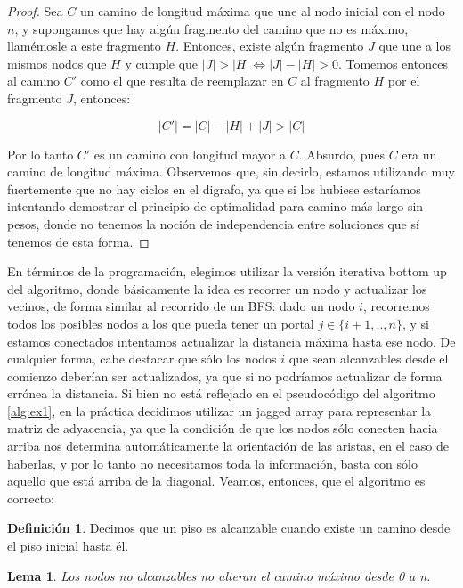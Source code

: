 \documentclass{article}
\newtheorem{lemma}{Lema}[theorem]
\theoremstyle{definition}
\newtheorem{definition}{Definición}[section]
\theoremstyle{remark}
\begin{document}
\begin{proof}
Sea $C$ un camino de longitud máxima que une al nodo inicial con el nodo $n$, y supongamos que hay algún fragmento del camino que no es máximo, llamémosle a este fragmento $H$. Entonces, existe algún fragmento $J$ que une a los mismos nodos que $H$ y cumple que $|J| > |H| \iff |J| - |H| > 0$. Tomemos entonces al camino $C'$ como el que resulta de reemplazar en $C$ al fragmento $H$ por el fragmento $J$, entonces:

$$|C'| = |C| - |H| + |J| > |C|$$

Por lo tanto $C'$ es un camino con longitud mayor a $C$. Absurdo, pues $C$ era un camino de longitud máxima. Observemos que, sin decirlo, estamos utilizando muy fuertemente que no hay ciclos en el digrafo, ya que si los hubiese estaríamos intentando demostrar el principio de optimalidad para camino más largo sin pesos, donde no tenemos la noción de independencia entre soluciones que sí tenemos de esta forma.
\end{proof}

En términos de la programación, elegimos utilizar la versión iterativa bottom up del algoritmo, donde básicamente la idea es recorrer un nodo y actualizar los vecinos, de forma similar al recorrido de un BFS: dado un nodo $i$, recorremos todos los posibles nodos a los que pueda tener un portal $j \in \{i + 1, .., n\}$, y si estamos conectados intentamos actualizar la distancia máxima hasta ese nodo. De cualquier forma, cabe destacar que sólo los nodos $i$ que sean alcanzables desde el comienzo deberían ser actualizados, ya que si no podríamos actualizar de forma errónea la distancia. Si bien no está reflejado en el pseudocódigo del algoritmo \ref{alg:ex1}, en la práctica decidimos utilizar un jagged array para representar la matriz de adyacencia, ya que la condición de que los nodos sólo conecten hacia arriba nos determina automáticamente la orientación de las aristas, en el caso de haberlas, y por lo tanto no necesitamos toda la información, basta con sólo aquello que está arriba de la diagonal. Veamos, entonces, que el algoritmo es correcto:

\begin{definition}
Decimos que un piso es alcanzable cuando existe un camino desde el piso inicial hasta él.
\end{definition}

\begin{lemma}
Los nodos no alcanzables no alteran el camino máximo desde 0 a n.
\end{lemma}
\end{document}
